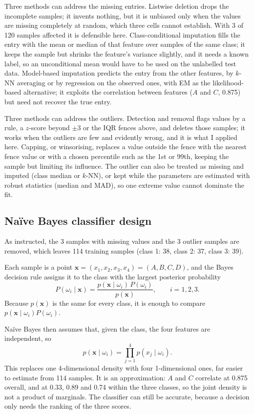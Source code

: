 Three methods can address the missing entries. Listwise deletion drops the incomplete samples; it invents nothing, but it is
unbiased only when the values are missing completely at random, which three cells cannot establish. With 3 of 120 samples
affected it is defensible here. Class-conditional imputation fills the entry with the mean or median of that feature over samples
of the same class; it keeps the sample but shrinks the feature's variance slightly, and it needs a known label, so an
unconditional mean would have to be used on the unlabelled test data. Model-based imputation predicts the entry from the other
features, by $k$-NN averaging or by regression on the observed ones, with EM as the likelihood-based alternative; it exploits the
correlation between features ($A$ and $C$, 0.875) but need not recover the true entry.

Three methods can address the outliers. Detection and removal flags values by a rule, a $z$-score beyond $\pm 3$ or the IQR
fences above, and deletes those samples; it works when the outliers are few and evidently wrong, and it is what I applied here.
Capping, or winsorising, replaces a value outside the fence with the nearest fence value or with a chosen percentile such as the
1st or 99th, keeping the sample but limiting its influence. The outlier can also be treated as missing and imputed (class median
or $k$-NN), or kept while the parameters are estimated with robust statistics (median and MAD), so one extreme value cannot
dominate the fit.

\subsection{Na\"ive Bayes classifier design}

As instructed, the 3 samples with missing values and the 3 outlier samples are removed, which leaves 114 training samples
(class 1: 38, class 2: 37, class 3: 39).

Each sample is a point $\mathbf{x} = (x_1, x_2, x_3, x_4) = (A, B, C, D)$, and the Bayes decision rule assigns it to the class
with the largest posterior probability
\[
P(\omega_i \mid \mathbf{x}) = \frac{p(\mathbf{x}\mid\omega_i)\,P(\omega_i)}{p(\mathbf{x})},
\qquad i = 1,2,3 .
\]
Because $p(\mathbf{x})$ is the same for every class, it is enough to compare $p(\mathbf{x}\mid\omega_i)P(\omega_i)$.

Na\"ive Bayes then assumes that, given the class, the four features are independent, so
\[
p(\mathbf{x}\mid\omega_i) = \prod_{j=1}^{4} p(x_j\mid\omega_i).
\]
This replaces one 4-dimensional density with four 1-dimensional ones, far easier to estimate from 114 samples. It is an
approximation: $A$ and $C$ correlate at 0.875 overall, and at 0.33, 0.89 and 0.74 within the three classes, so the joint density
is not a product of marginals. The classifier can still be accurate, because a decision only needs the ranking of the three
scores.

